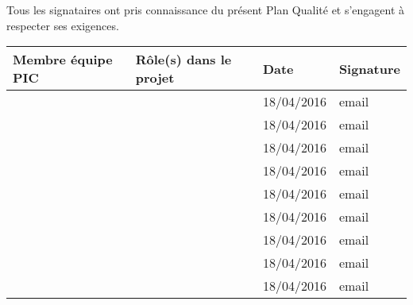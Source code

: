 Tous les signataires ont pris connaissance du présent Plan Qualité et s'engagent à respecter ses exigences. \\
	
	\vspace{1cm}

\begin{tabular}[h]{|p{}|p{}|p{}|p{}|}
	\hline
	
	\cellcolor{gray!40}Membre équipe PIC & \cellcolor{gray!40}Rôle(s) dans le projet & \cellcolor{gray!40}Date & \cellcolor{gray!40}Signature \\\hline
	\Sergi & \CP & 18/04/2016 & email \\\hline
	\Pierre & \RQ \newline \CPA & 18/04/2016 & email \\\hline
	\Michel & \D \newline \RD & 18/04/2016 & email \\\hline
	\Kafui & \D \newline \RQA & 18/04/2016 & email \\\hline
	\Matthieu & \D \newline \RRS & 18/04/2016 & email \\\hline
	\Mathieu & \D \newline \RGC & 18/04/2016 & email \\\hline
	\Melissa & \D & 18/04/2016 & email \\\hline
	\Julie & \D & 18/04/2016 & email \\\hline
	\Florian & \D & 18/04/2016 & email \\\hline
\end{tabular}
